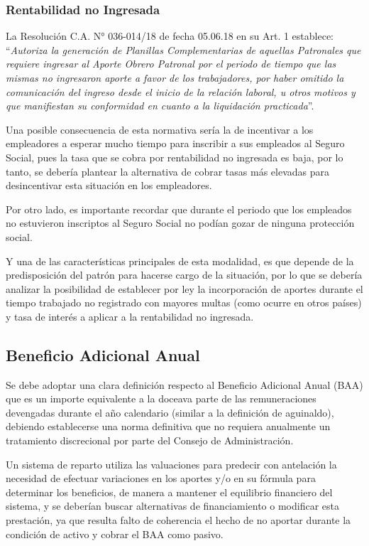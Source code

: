 \documentclass[a4paper,11pt]{article}
\begin{document}
\subsubsection{Rentabilidad no Ingresada}


La Resolución C.A. N° 036-014/18 de fecha 05.06.18 en su Art. 1 establece: “\textit{Autoriza la generación de Planillas Complementarias de aquellas Patronales que requiere ingresar al Aporte Obrero Patronal por el periodo de tiempo que las mismas no ingresaron aporte a favor de los trabajadores, por haber omitido la comunicación del ingreso desde el inicio de la relación laboral, u otros motivos y que manifiestan su conformidad en cuanto a la liquidación practicada}”.

Una posible consecuencia de esta normativa sería la de incentivar a los empleadores a esperar mucho tiempo para inscribir a sus empleados al Seguro Social, pues la tasa que se cobra por rentabilidad no ingresada es baja, por lo tanto, se debería plantear la alternativa de cobrar tasas más elevadas para desincentivar esta situación en los empleadores.

Por otro lado, es importante recordar que durante el periodo que los empleados no estuvieron inscriptos al Seguro Social no podían gozar de ninguna protección social.

Y una de las características principales de esta modalidad, es que depende de la predisposición del patrón para hacerse cargo de la situación, por lo que se debería analizar la posibilidad de establecer por ley la incorporación de aportes durante el tiempo trabajado no registrado con mayores multas (como ocurre en otros países) y tasa de interés a aplicar a la rentabilidad no ingresada.


\subsection{Beneficio Adicional Anual}

Se debe adoptar una clara definición respecto al Beneficio Adicional Anual (BAA) que es un importe equivalente a la doceava parte de las remuneraciones devengadas durante el año calendario (similar a la definición de aguinaldo), debiendo establecerse una norma definitiva que no requiera anualmente un tratamiento discrecional por parte del Consejo de Administración. 

Un sistema de reparto utiliza las valuaciones para predecir con antelación la necesidad de efectuar variaciones en los aportes y/o en su fórmula para determinar los beneficios, de manera a mantener el equilibrio financiero del sistema, y se deberían buscar alternativas de financiamiento o modificar esta prestación, ya que resulta falto de coherencia el hecho de no aportar durante la condición de activo y cobrar el BAA como pasivo.
\end{document}
